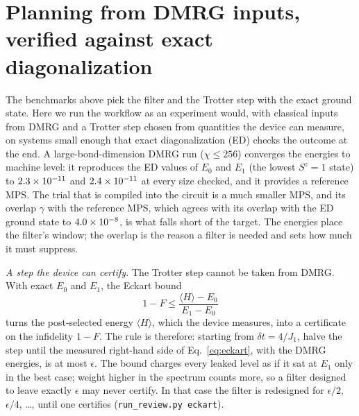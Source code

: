 \documentclass[aps,pra,twocolumn,superscriptaddress,nofootinbib]{revtex4-2}
\begin{document}
\section{Planning from DMRG inputs, verified against exact diagonalization}
\label{sec:dmrg}

The benchmarks above pick the filter and the Trotter step with the exact ground state. Here we run the workflow as an
experiment would, with classical inputs from DMRG and a Trotter step chosen from quantities the device can measure,
on systems small enough that exact diagonalization (ED) checks the outcome at the end. A large-bond-dimension DMRG run
($\chi\le256$) converges the energies to machine level: it reproduces the ED values of $E_0$ and $E_1$ (the lowest
$S^z=1$ state) to $2.3\times10^{-11}$ and $2.4\times10^{-11}$ at every size checked, and it provides a reference MPS. The trial
that is compiled into the circuit is a much smaller MPS, and its overlap $\gamma$ with the reference MPS, which agrees
with its overlap with the ED ground state to $4.0\times10^{-8}$, is what falls short of the target. The energies place the
filter's window; the overlap is the reason a filter is needed and sets how much it must suppress.

\emph{A step the device can certify.} The Trotter step cannot be taken from DMRG. With exact $E_0$ and $E_1$, the Eckart
bound
\begin{equation}
1-F\le\frac{\langle H\rangle-E_0}{E_1-E_0}
\label{eq:eckart}
\end{equation}
turns the post-selected energy $\langle H\rangle$, which the device measures, into a certificate on the infidelity
$1-F$. The rule is therefore: starting from $\delta t=4/J_1$, halve the step until the measured right-hand side of
Eq.~\eqref{eq:eckart}, with the DMRG energies, is at most $\epsilon$. The bound charges every leaked level as if it
sat at $E_1$ only in the best case; weight higher in the spectrum counts more, so a filter designed to leave exactly
$\epsilon$ may never certify. In that case the filter is redesigned for $\epsilon/2$, $\epsilon/4$, \dots, until one
certifies (\texttt{run\_review.py eckart}).
\end{document}
